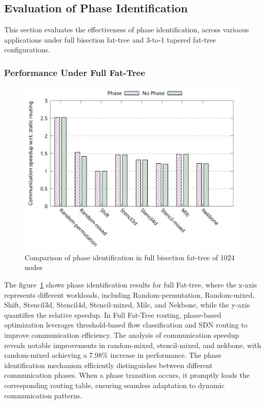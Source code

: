 \subsection{Evaluation of Phase Identification}
This section evaluates the effectiveness of phase identification, across varioous applications under full bisection fat-tree and 3-to-1 tapered fat-tree configurations.

\subsubsection{Performance Under Full Fat-Tree}


\begin{figure}[h]
  \centering
  \includegraphics[width=\columnwidth]{./figs_4/phase_full.pdf}
  \caption{Comparison of phase identification in full bisection fat-tree of 1024 nodes}
  \label{fig:phase_full}
\end{figure}
The figure~\ref{fig:phase_full} shows phase identification results for full Fat-tree, where the x-axis represents different workloads, including Random-permutation, Random-mixed, Shift, Stencil3d, Stencil4d, Stencil-mixed, Milc, and Nekbone, while the y-axis quantifies the relative speedup. 
In Full Fat-Tree routing, phase-based optimization leverages threshold-based flow classification and SDN routing to improve communication efficiency. The analysis of communication speedup reveals notable improvements in random-mixed, stencil-mixed, and nekbone, with random-mixed achieving a 7.98\% increase in performance. The phase identification mechanism efficiently distinguishes between different communication phases. When a phase transition occurs, it promptly loads the corresponding routing table, ensuring seamless adaptation to dynamic communication patterns.

